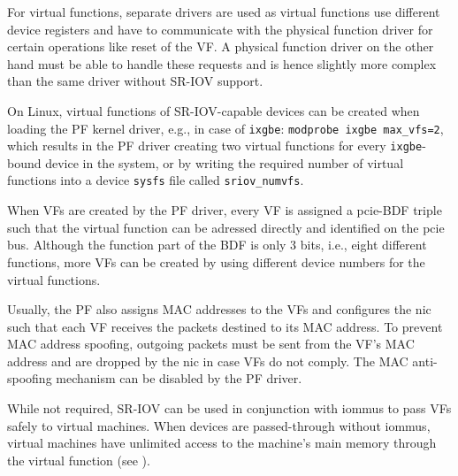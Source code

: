 For virtual functions, separate drivers are used as virtual functions use
different device registers and have to communicate with the physical function
driver for certain operations like reset of the VF. A physical function driver
on the other hand must be able to handle these requests and is hence slightly
more complex than the same driver without SR-IOV support.

On Linux, virtual functions of SR-IOV-capable devices can be created when
loading the PF kernel driver, e.g., in case of \texttt{ixgbe}: \texttt{modprobe
ixgbe max\_vfs=2}, which results in the PF driver creating two virtual functions
for every \texttt{ixgbe}-bound device in the system, or by writing the required
number of virtual functions into a device \texttt{sysfs} file called
\texttt{sriov\_numvfs}.

When VFs are created by the PF driver, every VF is assigned a \ac{pcie}-BDF
triple such that the virtual function can be adressed directly and identified on
the \ac{pcie} bus. Although the function part of the BDF is only 3 bits, i.e.,
eight different functions, more VFs can be created by using different device
numbers for the virtual functions.

Usually, the PF also assigns MAC addresses to the VFs and configures the
\ac{nic} such that each VF receives the packets destined to its MAC address. To
prevent MAC address spoofing, outgoing packets must be sent from the VF's MAC
address and are dropped by the \ac{nic} in case VFs do not comply. The MAC
anti-spoofing mechanism can be disabled by the PF driver.

While not required, SR-IOV can be used in conjunction with \acp{iommu} to pass
VFs safely to virtual machines. When devices are passed-through without
\acp{iommu}, virtual machines have unlimited access to the machine's main memory
through the virtual function (see ).

